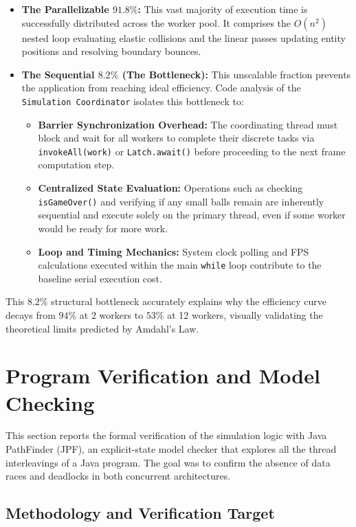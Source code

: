 \documentclass{scrartcl}
\begin{document}
\begin{itemize}
    \item \textbf{The Parallelizable $91.8\%$:} This vast majority of execution time is successfully distributed across the worker pool. It comprises the $O(n^2)$ nested loop evaluating elastic collisions and the linear passes updating entity positions and resolving boundary bounces.
    \item \textbf{The Sequential $8.2\%$ (The Bottleneck):} This unscalable fraction prevents the application from reaching ideal efficiency. Code analysis of the \texttt{Simulation Coordinator} isolates this bottleneck to:
    \begin{itemize}
        \item \textbf{Barrier Synchronization Overhead:} The coordinating thread must block and wait for all workers to complete their discrete tasks via \texttt{invokeAll(work)} or \texttt{Latch.await()} before proceeding to the next frame computation step.
        \item \textbf{Centralized State Evaluation:} Operations such as checking \texttt{isGameOver()} and verifying if any small balls remain are inherently sequential and execute solely on the primary thread, even if some worker would be ready for more work.
        \item \textbf{Loop and Timing Mechanics:} System clock polling and FPS calculations executed within the main \texttt{while} loop contribute to the baseline serial execution cost.
    \end{itemize}
\end{itemize}
This $8.2\%$ structural bottleneck accurately explains why the efficiency curve decays from $94\%$ at 2 workers to $53\%$ at 12 workers, visually validating the theoretical limits predicted by Amdahl's Law.

\section{Program Verification and Model Checking}

This section reports the formal verification of the simulation logic with Java PathFinder (JPF), an explicit-state model checker that explores all the thread interleavings of a Java program. The goal was to confirm the absence of data races and deadlocks in both concurrent architectures.

\subsection{Methodology and Verification Target}
\end{document}
